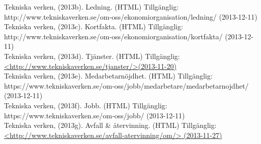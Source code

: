 \documentclass[10pt,a4paper]{article}
\begin{document}
Tekniska verken, (2013b). Ledning. (HTML) Tillgänglig: \\
http://www.tekniskaverken.se/om-oss/ekonomiorganisation/ledning/ (2013-12-11)\\

Tekniska verken, (2013c). Kortfakta. (HTML) Tillgänglig: \\
http://www.tekniskaverken.se/om-oss/ekonomiorganisation/kortfakta/ (2013-12-11)\\

Tekniska verken, (2013d). Tjänster. (HTML) Tillgänglig: \\
\hyperref{http://www.tekniskaverken.se/tjanster/}{}{}{<http://www.tekniskaverken.se/tjanster/>(2013-11-20)}\\

Tekniska verken, (2013e). Medarbetarnöjdhet. (HTML) Tillgänglig: \\
https://www.tekniskaverken.se/om-oss/jobb/medarbetare/medarbetarnojdhet/ (2013-12-11)\\

Tekniska verken, (2013f). Jobb. (HTML) Tillgänglig: \\
https://www.tekniskaverken.se/om-oss/jobb/ (2013-12-11)\\

Tekniska verken, (2013g). Avfall \& återvinning. (HTML) Tillgänglig: \\
\hyperref{http://www.tekniskaverken.se/avfall-atervinning/om/}{}{}{<http://www.tekniskaverken.se/avfall-atervinning/om/> (2013-11-27)} \\
\end{document}

